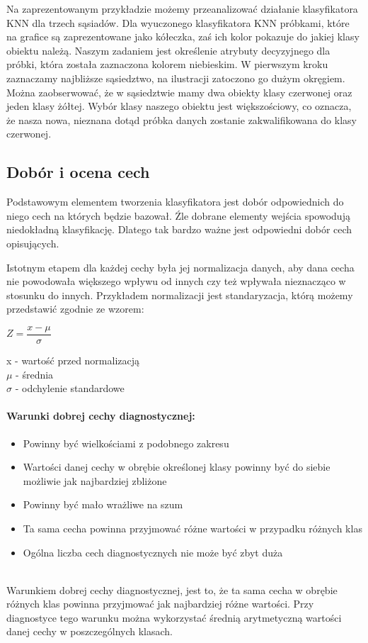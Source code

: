 \documentclass[a4paper,12pt,twoside,openany]{report}
\begin{document}
Na zaprezentowanym przykładzie możemy przeanalizować działanie klasyfikatora KNN dla trzech sąsiadów. Dla wyuczonego klasyfikatora KNN próbkami, które na grafice są zaprezentowane jako kółeczka, zaś ich kolor pokazuje do jakiej klasy obiektu należą. Naszym zadaniem jest określenie atrybuty decyzyjnego dla próbki, która została zaznaczona kolorem niebieskim. W pierwszym kroku zaznaczamy najbliższe sąsiedztwo, na ilustracji zatoczono go dużym okręgiem. Można zaobserwować, że w sąsiedztwie mamy dwa obiekty klasy czerwonej oraz jeden klasy żółtej. Wybór klasy naszego obiektu jest większościowy, co oznacza, że nasza nowa, nieznana dotąd próbka danych zostanie zakwalifikowana do klasy czerwonej.


\subsection{Dobór i ocena cech}
Podstawowym elementem tworzenia klasyfikatora jest dobór odpowiednich do niego cech na których będzie bazował. Źle dobrane elementy wejścia spowodują niedokładną klasyfikację. Dlatego tak bardzo ważne jest odpowiedni dobór cech opisujących.

Istotnym etapem dla każdej cechy była jej normalizacja danych, aby dana cecha nie powodowała większego wpływu od innych czy też wpływała nieznacząco w stosunku do innych. Przykładem normalizacji jest standaryzacja, którą możemy przedstawić zgodnie ze wzorem: 
\begin{center}
	{\large $ Z = \dfrac{x - \mu}{\sigma} $ \par}
\end{center}
x - wartość przed normalizacją \\ $\mu$ - średnia \\ $\sigma$ - odchylenie standardowe

\paragraph{Warunki dobrej cechy diagnostycznej: }
\begin{itemize}
	\item Powinny być wielkościami z podobnego zakresu
	\item Wartości danej cechy w obrębie określonej klasy powinny być do siebie możliwie jak najbardziej zbliżone
	\item Powinny być mało wrażliwe na szum
	\item Ta sama cecha powinna przyjmować różne wartości w przypadku różnych klas
	\item Ogólna liczba cech diagnostycznych nie może być zbyt duża \cite{Osowski}
\end{itemize}
\mbox{} \\
Warunkiem dobrej cechy diagnostycznej, jest to, że ta sama cecha w obrębie różnych klas powinna przyjmować jak najbardziej różne wartości. Przy diagnostyce tego warunku można wykorzystać średnią arytmetyczną wartości danej cechy w poszczególnych klasach.
\end{document}
